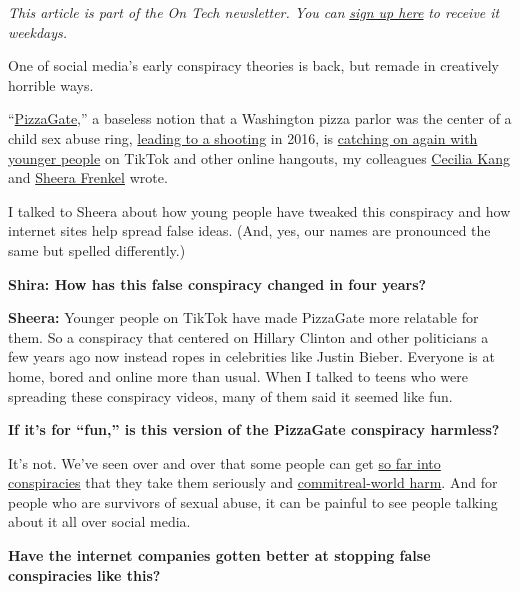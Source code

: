 \emph{This article is part of the On Tech newsletter. You can}
\href{https://www.nytimes.com/newsletters/signup/OT}{\emph{sign up
here}} \emph{to receive it weekdays.}

One of social media's early conspiracy theories is back, but remade in
creatively horrible ways.

``\href{https://www.nytimes.com/interactive/2016/12/10/business/media/pizzagate.html}{PizzaGate,}''
a baseless notion that a Washington pizza parlor was the center of a
child sex abuse ring,
\href{https://www.nytimes.com/2016/12/05/business/media/comet-ping-pong-pizza-shooting-fake-news-consequences.html}{leading
to a shooting} in 2016, is
\href{https://www.nytimes.com/2020/06/27/technology/pizzagate-justin-bieber-qanon-tiktok.html}{catching
on again with younger people} on TikTok and other online hangouts, my
colleagues \href{https://www.nytimes.com/by/cecilia-kang}{Cecilia Kang}
and \href{https://www.nytimes.com/by/sheera-frenkel}{Sheera Frenkel}
wrote.

I talked to Sheera about how young people have tweaked this conspiracy
and how internet sites help spread false ideas. (And, yes, our names are
pronounced the same but spelled differently.)

\textbf{Shira: How has this false conspiracy changed in four years?}

\textbf{Sheera:} Younger people on TikTok have made PizzaGate more
relatable for them. So a conspiracy that centered on Hillary Clinton and
other politicians a few years ago now instead ropes in celebrities like
Justin Bieber. Everyone is at home, bored and online more than usual.
When I talked to teens who were spreading these conspiracy videos, many
of them said it seemed like fun.

\textbf{If it's for ``fun,'' is this version of the PizzaGate conspiracy
harmless?}

It's not. We've seen over and over that some people can get
\href{https://www.nytimes.com/2020/04/23/podcasts/rabbit-hole-internet-youtube-virus.html}{so
far into conspiracies} that they take them seriously and
\href{https://www.nytimes.com/2020/04/10/technology/coronavirus-5g-uk.html}{commit}\href{https://www.nytimes.com/2020/02/09/us/politics/qanon-trump-conspiracy-theory.html}{real-world
harm}. And for people who are survivors of sexual abuse, it can be
painful to see people talking about it all over social media.

\textbf{Have the internet companies gotten better at stopping false
conspiracies like this?}

